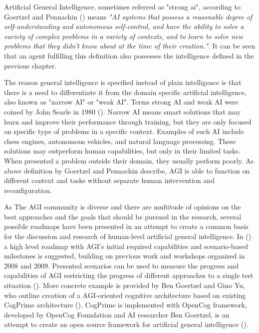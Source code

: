 \documentclass[utf8,english]{gradu3}
\begin{document}




Artificial General Intelligence, sometimes referred as "strong ai", according to Goertzel and Pennachin (\cite*{goertzel2007}) means \emph{"AI systems that possess a reasonable degree of self-understanding and autonomous self-control, and have the ability to solve a variety of complex problems in a variety of contexts, and to learn to solve new problems that they didn't know about at the time of their creation."}. It can be seen that an agent fulfilling this definition also possesses the intelligence defined in the previous chapter.

 The reason general intelligence is specified instead of plain intelligence is that there is a need to differentiate it from the domain specific artificial intelligence, also known as "narrow AI" or "weak AI". Terms strong AI and weak AI were coined by John Searle in 1980 (\cite{searle1980}). Narrow AI means smart solutions that may learn and improve their performance through training, but they are only focused on specific type of problems in a specific context. Examples of such AI include chess engines, autonomous vehicles, and natural language processing. These solutions may outperform human capabilities, but only in their limited tasks. When presented a problem outside their domain, they usually perform poorly.
As above definition by Goertzel and Pennachin describe, AGI is able to function on different context and tasks without separate human intervention and reconfiguration.


As The AGI community is diverse and there are multitude of opinions on the best approaches and the goals that should be pursued in the research, several possible roadmaps have been presented in an attempt to create a common basis for the discussion and research of human-level artificial general intelligence. In (\cite{adams2012}) a high level roadmap with AGI's initial required capabilities and scenario-based milestones is suggested, building on previous work and workshops organized in 2008 and 2009. Presented scenarios can be used to measure the progress and capabilities of AGI restricting the progress of different approaches to a single test situation (\cite{adams2012}).
More concrete example is provided by Ben Goertzel and Gino Yu, who outline creation of a AGI-oriented cognitive architecture based on existing CogPrime architecture (\cite{goertzel2014map}). CogPrime is implemented with OpenCog framework, developed by OpenCog Foundation and AI researcher Ben Goertzel, is an attempt to create an open source framework for artificial general intelligence (\cite{opencogwiki,goertzel2012cog}).
\end{document}
